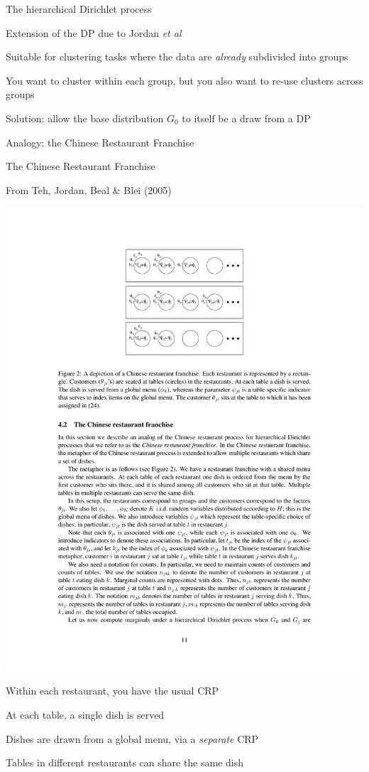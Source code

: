 \documentclass{beamer}
\begin{document}
\begin{frame}{The hierarchical Dirichlet process}

\itemb
\item Extension of the DP due to Jordan {\em et al}
\item Suitable for clustering tasks where the data are {\em already} subdivided into groups
\item You want to cluster within each group, but you also want to re-use clusters across groups
\item Solution: allow the base distribution $G_0$ to itself be a draw from a DP
\item Analogy: the \alert{Chinese Restaurant Franchise}
\iteme

\end{frame}


\begin{frame}{The Chinese Restaurant Franchise}

From Teh, Jordan, Beal \& Blei (2005)
\centerline{
  \includegraphics[height=.5\textheight]{ChineseRestaurantFranchise.pdf}
}

\itemb
\item Within each restaurant, you have the usual CRP
\item At each table, a single dish is served
\item Dishes are drawn from a global menu, via a {\em separate} CRP
\item Tables in different restaurants can share the same dish
\iteme

\end{frame}
\end{document}
